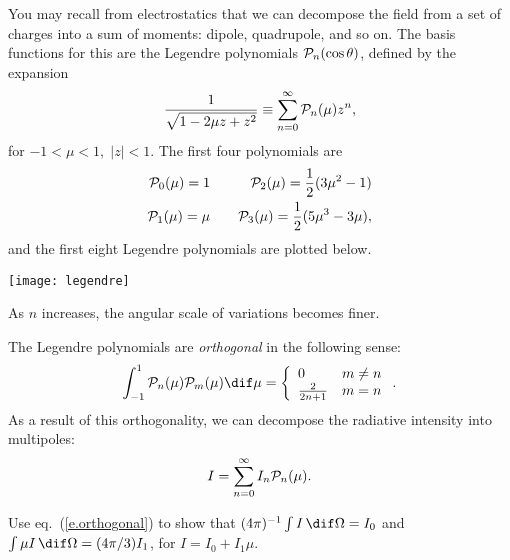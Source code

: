 \begin{sidebar}
\label{sb.intensity-decomposition}
You may recall from electrostatics that we can decompose the field from a set of charges into a sum of moments: dipole, quadrupole, and so on. The basis functions for this are the Legendre polynomials $\mathcal{P}_{n}(\cos\theta)$, defined by the expansion
\[
	\frac{1}{\sqrt{1 - 2\mu z + z^{2}}} \equiv \sum_{n=0}^{\infty}\mathcal{P}_{n}(\mu)z^{n},
\]
for $-1<\mu<1,\;|z| < 1$. The first four polynomials are
\begin{eqnarray*}
	\mathcal{P}_{0}(\mu) = 1 &\quad& \mathcal{P}_{2}(\mu) = \frac{1}{2}(3\mu^{2}-1)\\
	\mathcal{P}_{1}(\mu) = \mu &\quad& \mathcal{P}_{3}(\mu) = \frac{1}{2}(5\mu^{3}-3\mu),
\end{eqnarray*}
and the first eight Legendre polynomials are plotted below.

\texttt{[image: legendre]}

\noindent As $n$ increases, the angular scale of variations becomes finer.

The Legendre polynomials are \emph{orthogonal} in the following sense:
\begin{equation}\label{e.orthogonal}
\int_{-1}^{1}\Pl{n}(\mu)\Pl{m}(\mu)\dif \mu = \left\{
\begin{array}{lr}
	0 &  m\neq n\\
	\frac{2}{2n+1} & m=n
\end{array}\right..
\end{equation}
As a result of this orthogonality, we can decompose the radiative intensity into multipoles:
\begin{equation}\label{e.decomposition}
	I = \sum_{n=0}^{\infty} I_{n} \mathcal{P}_{n}(\mu).
\end{equation}

\begin{exercisebox}
\label{e.symmetry-powers-mu}
Use eq.~(\ref{e.orthogonal}) to show that $(4\pi)^{-1}\int I\,\dif\Omega = I_{0}$ and $\int \mu I\,\dif\Omega = (4\pi/3)I_{1}$, for $I = I_{0} + I_{1}\mu$.
\end{exercisebox}

\end{sidebar}

